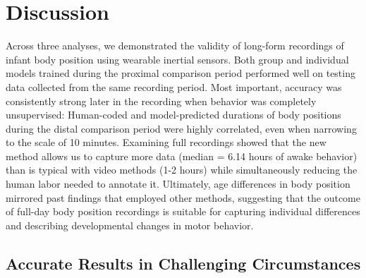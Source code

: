 \documentclass[
  man]{apa6}
\begin{document}
\hypertarget{discussion}{%
\section{Discussion}\label{discussion}}

Across three analyses, we demonstrated the validity of long-form recordings of infant body position using wearable inertial sensors. Both group and individual models trained during the proximal comparison period performed well on testing data collected from the same recording period. Most important, accuracy was consistently strong later in the recording when behavior was completely unsupervised: Human-coded and model-predicted durations of body positions during the distal comparison period were highly correlated, even when narrowing to the scale of 10 minutes. Examining full recordings showed that the new method allows us to capture more data (median = 6.14 hours of awake behavior) than is typical with video methods (1-2 hours) while simultaneously reducing the human labor needed to annotate it. Ultimately, age differences in body position mirrored past findings that employed other methods, suggesting that the outcome of full-day body position recordings is suitable for capturing individual differences and describing developmental changes in motor behavior.

\hypertarget{accurate-results-in-challenging-circumstances}{%
\subsection{Accurate Results in Challenging Circumstances}\label{accurate-results-in-challenging-circumstances}}
\end{document}

